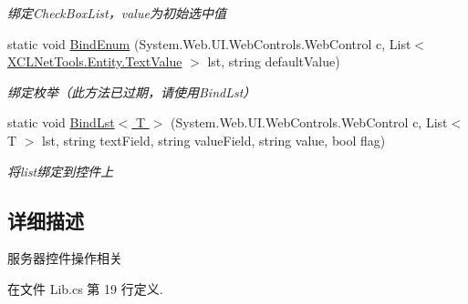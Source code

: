 \begin{DoxyCompactItemize}
\begin{DoxyCompactList}\small\item\em 绑定\-Check\-Box\-List，value为初始选中值 \end{DoxyCompactList}\item 
static void \hyperlink{class_x_c_l_net_tools_1_1_control_1_1_server_control_1_1_lib_acf0e494ba2e94742818fbebfd883ab17}{Bind\-Enum} (System.\-Web.\-U\-I.\-Web\-Controls.\-Web\-Control c, List$<$ \hyperlink{class_x_c_l_net_tools_1_1_entity_1_1_text_value}{X\-C\-L\-Net\-Tools.\-Entity.\-Text\-Value} $>$ lst, string default\-Value)
\begin{DoxyCompactList}\small\item\em 绑定枚举（此方法已过期，请使用\-Bind\-Lst） \end{DoxyCompactList}\item 
static void \hyperlink{class_x_c_l_net_tools_1_1_control_1_1_server_control_1_1_lib_ad5ebfd4eb97120e0049cd0260e150ed9}{Bind\-Lst$<$ T $>$} (System.\-Web.\-U\-I.\-Web\-Controls.\-Web\-Control c, List$<$ T $>$ lst, string text\-Field, string value\-Field, string value, bool flag)
\begin{DoxyCompactList}\small\item\em 将list绑定到控件上 \end{DoxyCompactList}\end{DoxyCompactItemize}


\subsection{详细描述}
服务器控件操作相关 



在文件 Lib.\-cs 第 19 行定义.



